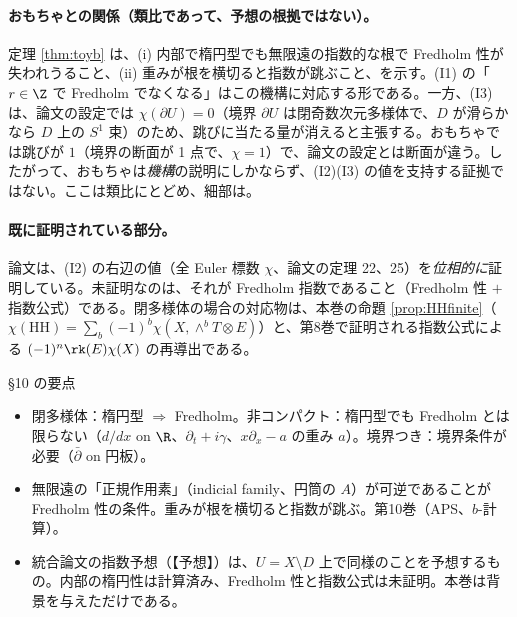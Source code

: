 \paragraph{おもちゃとの関係（類比であって、予想の根拠ではない）。}定理 \ref{thm:toyb} は、(i) 内部で楕円型でも無限遠の指数的な根で Fredholm 性が失われうること、(ii) 重みが根を横切ると指数が跳ぶこと、を示す。(I1) の「$r\in\Z$ で Fredholm でなくなる」はこの機構に対応する形である。一方、(I3) は、論文の設定では $\chi(\partial U)=0$（境界 $\partial U$ は閉奇数次元多様体で、$D$ が滑らかなら $D$ 上の $S^1$ 束）のため、跳びに当たる量が消えると主張する。おもちゃでは跳びが $1$（境界の断面が 1 点で、$\chi=1$）で、論文の設定とは断面が違う。したがって、おもちゃは\emph{機構}の説明にしかならず、(I2)(I3) の値を支持する証拠ではない。ここは類比にとどめ、細部は\tQ。
\paragraph{既に証明されている部分。}論文は、(I2) の右辺の値（全 Euler 標数 $\chi$、論文の定理 22、25）を\emph{位相的に}証明している。未証明なのは、それが Fredholm 指数であること（Fredholm 性 $+$ 指数公式）である。閉多様体の場合の対応物は、本巻の命題 \ref{prop:HHfinite}（$\chi(\mathrm{HH})=\sum_b(-1)^b\chi(X,\wedge^bT\otimes E)$）と、第8巻で証明される指数公式による $(-1)^n\rk(E)\chi(X)$ の再導出である。
\begin{keybox}{§10 の要点}
\begin{itemize}
\item 閉多様体：楕円型 $\Rightarrow$ Fredholm。非コンパクト：楕円型でも Fredholm とは限らない（$d/dx$ on $\R$、$\partial_t+i\gamma$、$x\partial_x-a$ の重み $a$）。境界つき：境界条件が必要（$\bar\partial$ on 円板）。
\item 無限遠の「正規作用素」（indicial family、円筒の $A$）が可逆であることが Fredholm 性の条件。重みが根を横切ると指数が跳ぶ。第10巻（APS、$b$-計算）。
\item 統合論文の指数予想（【予想】）は、$U=X\setminus D$ 上で同様のことを予想するもの。内部の楕円性は計算済み、Fredholm 性と指数公式は未証明。本巻は背景を与えただけである。
\end{itemize}
\end{keybox}
